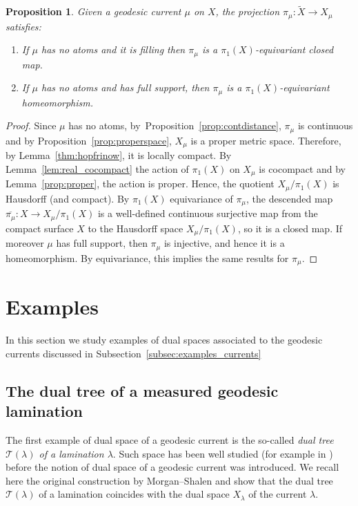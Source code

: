 \documentclass[12pt,article]{amsart}
\numberwithin{equation}{section}
\numberwithin{figure}{section}
\newtheorem{proposition}[equation]{Proposition}
\theoremstyle{definition}
\theoremstyle{plain}
\newcommand*{\wt}[1]{\widetilde{#1}}
\begin{document}
\begin{proposition}
Given a geodesic current $\mu$ on $X$, the projection $\pi_{\mu} \colon \wt{X} \to X_{\mu}$ satisfies:
\begin{enumerate}
\item If $\mu$ has no atoms and it is filling then $\pi_{\mu}$ is a $\pi_1(X)$-equivariant closed map.
\item If $\mu$ has no atoms and has full support, then $\pi_{\mu}$ is a $\pi_1(X)$-equivariant homeomorphism.
\end{enumerate}
\label{thm:homeoprojection}
\end{proposition}
\begin{proof}
Since $\mu$ has no atoms, by~Proposition~\ref{prop:contdistance}, $\pi_{\mu}$ is continuous and by Proposition~\ref{prop:properspace}, $X_{\mu}$ is a proper metric space. Therefore, by Lemma~\ref{thm:hopfrinow}, it is locally compact.
By Lemma~\ref{lem:real_cocompact} the action of $\pi_1(X)$ on $X_{\mu}$ is cocompact and by Lemma~\ref{prop:proper}, the action is proper. Hence, the quotient $X_{\mu}/\pi_1(X)$ is Hausdorff (and compact). By $\pi_1(X)$ equivariance of $\pi_{\mu}$, the descended map $\overline{\pi_{\mu}} \colon X \to X_{\mu}/\pi_1(X)$ is a well-defined continuous surjective map from the compact surface $X$ to the Hausdorff space $X_{\mu}/\pi_1(X)$, so it is a closed map. If moreover $\mu$ has full support, then $\pi_{\mu}$ is injective, and hence it is a homeomorphism. By equivariance, this implies the same results for $\pi_{\mu}$.\end{proof}
\section{Examples}
\label{sec:examples}

In this section we study examples of dual spaces associated to the geodesic currents discussed in Subsection~\ref{subsec:examples_currents}

\subsection{The dual tree of a measured geodesic lamination}
\label{subsec:dual_tree}
The first example of dual space of a geodesic current is the so-called \emph{dual tree $\mathcal{T}(\lambda)$ of a lamination $\lambda$}.
Such space has been well studied (for example in \cite{MORGAN1991143}) before the notion of dual space of a geodesic current was introduced. We recall here the original construction by Morgan--Shalen and show that the dual tree $\mathcal{T}(\lambda)$ of a lamination coincides with the dual space $X_\lambda$ of the current $\lambda$.
\end{document}
